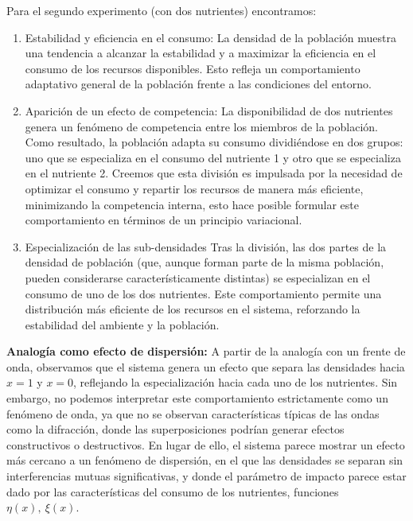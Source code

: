 Para el segundo experimento (con dos nutrientes) encontramos:
\begin{enumerate}
	\item Estabilidad y eficiencia en el consumo:
	      La densidad de la población muestra una tendencia a alcanzar la estabilidad y a maximizar la eficiencia en el consumo de los recursos disponibles. Esto refleja un comportamiento adaptativo general de la población frente a las condiciones del entorno.

	\item Aparición de un efecto de competencia:
	      La disponibilidad de dos nutrientes genera un fenómeno de competencia entre los miembros de la población. Como resultado, la población adapta su consumo dividiéndose en dos grupos: uno que se especializa en el consumo del nutriente 1 y otro que se especializa en el nutriente 2. Creemos que esta división es impulsada por la necesidad de optimizar el consumo y repartir los recursos de manera más eficiente, minimizando la competencia interna, esto hace posible formular este comportamiento en términos de un principio variacional.

	\item Especialización de las sub-densidades
	      Tras la división, las dos partes de la densidad de población (que, aunque forman parte de la misma población, pueden considerarse característicamente distintas) se especializan en el consumo de uno de los dos nutrientes. Este comportamiento permite una distribución más eficiente de los recursos en el sistema, reforzando la estabilidad del ambiente y la población.
\end{enumerate}

\textbf{Analogía como efecto de dispersión:}
A partir de la analogía con un frente de onda, observamos que el sistema genera un efecto que separa las densidades hacia $x=1$ y $x=0$, reflejando la especialización hacia cada uno de los nutrientes. Sin embargo, no podemos interpretar este comportamiento estrictamente como un fenómeno de onda, ya que no se observan características típicas de las ondas como la difracción, donde las superposiciones podrían generar efectos constructivos o destructivos. En lugar de ello, el sistema parece mostrar un efecto más cercano a un fenómeno de dispersión, en el que las densidades se separan sin interferencias mutuas significativas, y donde el parámetro de impacto parece estar dado por las características del consumo de los nutrientes, funciones $\eta(x),\:\xi(x)$.